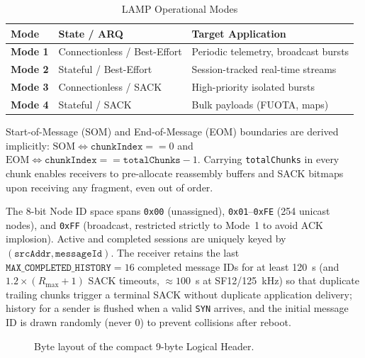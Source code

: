 \documentclass[journal]{IEEEtran}
\begin{document}
\begin{table}[htpb]
\centering
\caption{LAMP Operational Modes}
\label{tab:operational_modes}
\renewcommand{\arraystretch}{1.0}
\footnotesize
\begin{tabularx}{\columnwidth}{|l|l|>{\raggedright\arraybackslash}X|}
\hline
\textbf{Mode} & \textbf{State / ARQ} & \textbf{Target Application} \\ \hline
\textbf{Mode 1} & Connectionless / Best-Effort & Periodic telemetry, broadcast bursts \\ \hline
\textbf{Mode 2} & Stateful / Best-Effort & Session-tracked real-time streams \\ \hline
\textbf{Mode 3} & Connectionless / SACK & High-priority isolated bursts \\ \hline
\textbf{Mode 4} & Stateful / SACK & Bulk payloads (\acs{FUOTA}, maps) \\ \hline
\end{tabularx}
\end{table}

Start-of-Message (SOM) and End-of-Message (EOM) boundaries are derived implicitly: $\mathrm{SOM} \iff \texttt{chunkIndex} == 0$ and $\mathrm{EOM} \iff \texttt{chunkIndex} == \texttt{totalChunks} - 1$. Carrying \texttt{totalChunks} in every chunk enables receivers to pre-allocate reassembly buffers and SACK bitmaps upon receiving any fragment, even out of order.

The 8-bit Node ID space spans \texttt{0x00} (unassigned), \texttt{0x01}--\texttt{0xFE} (254 unicast nodes), and \texttt{0xFF} (broadcast, restricted strictly to Mode~1 to avoid ACK implosion). Active and completed sessions are uniquely keyed by $(\mathtt{srcAddr}, \mathtt{messageId})$. The receiver retains the last $\texttt{MAX\_COMPLETED\_HISTORY} = 16$ completed message IDs for at least 120~s (and $1.2\times(R_{\mathrm{max}}+1)$ SACK timeouts, $\approx 100$~s at SF12/125~kHz) so that duplicate trailing chunks trigger a terminal SACK without duplicate application delivery; history for a sender is flushed when a valid \texttt{SYN} arrives, and the initial message ID is drawn randomly (never 0) to prevent collisions after reboot.

\begin{figure}[htpb]
\centering
\renewcommand{\arraystretch}{1.0}
\caption{Byte layout of the compact 9-byte Logical Header.}
\label{fig:header_layout}
\end{figure}
\end{document}
